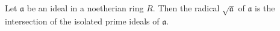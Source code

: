 Let $\mathfrak{a}$ be an ideal in a noetherian ring $R$. Then the radical $\sqrt{\mathfrak{a}}$ of $\mathfrak{a}$ is the intersection of the isolated prime ideals of $\mathfrak{a}$.
